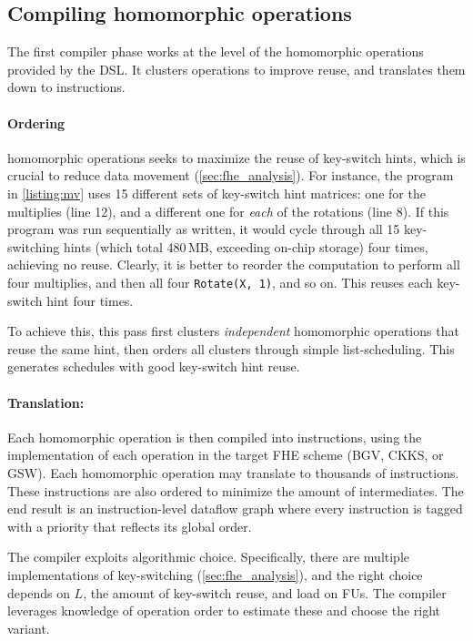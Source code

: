 \subsection{Compiling homomorphic operations}

The first compiler phase works at the level of the homomorphic operations
provided by the DSL. It clusters operations to improve reuse, and translates
them down to instructions.

\paragraph{Ordering} homomorphic operations seeks to maximize
the reuse of key-switch hints, which is crucial to reduce data movement (\autoref{sec:fhe_analysis}).
For instance, the program in  \autoref{listing:mv}
uses 15 different sets of key-switch hint matrices: one for the multiplies (line 12), 
and a different one for \emph{each} of the rotations (line 8).
If this program was run sequentially as written, it would cycle through all 15 key-switching hints
(which total 480\,MB, exceeding on-chip storage) four times, achieving no reuse.
Clearly, it is better to reorder the computation to perform all four multiplies, and then all four \texttt{Rotate(X, 1)}, and so on.
This reuses each key-switch hint four times.

To achieve this, this pass first clusters \emph{independent} homomorphic operations that reuse the same hint,
then orders all clusters through simple list-scheduling.
This generates schedules with good key-switch hint reuse.

\paragraph{Translation:} Each homomorphic operation is then compiled into instructions,
using the implementation of each operation in the target FHE scheme (BGV, CKKS, or GSW).
Each homomorphic operation may translate to thousands of instructions.
These instructions are also ordered to minimize the amount of intermediates.
The end result is an instruction-level dataflow graph where every instruction
is tagged with a priority that reflects its global order.

The compiler exploits algorithmic choice.
Specifically, there are multiple implementations of key-switching (\autoref{sec:fhe_analysis}),
and the right choice depends on $L$, the amount of key-switch reuse,
and load on FUs.
The compiler leverages knowledge of operation order to estimate these and choose the right variant.

